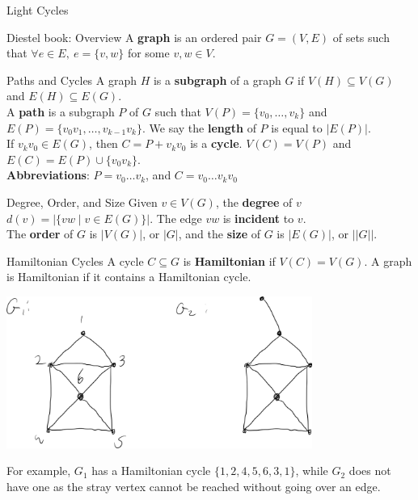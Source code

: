\documentclass[10pt]{extarticle}
\begin{document}
  \begin{problem}{Light Cycles}
    \begin{tcbraster}[raster columns = 1,colframe = black!75!white,colback=white]
    \end{tcbraster}
  \end{problem}
  \begin{problem}{Diestel book: Overview}
    A \textbf{graph} is an ordered pair $G = (V,E)$ of sets such that $\forall e\in E,~e=\{v,w\}$ for some $v,w\in V$.
    \begin{problem}{Paths and Cycles}
      A graph $H$ is a \textbf{subgraph} of a graph $G$ if $V(H) \subseteq V(G)$ and $E(H) \subseteq E(G)$. \\

      A \textbf{path} is a subgraph $P$ of $G$ such that $V(P) = \{v_0,\dots,v_k\}$ and $E(P) = \{v_0v_1,\dots,v_{k-1}v_k\}$. We say the \textbf{length} of $P$ is equal to $|E(P)|$.\\

      If $v_kv_0\in E(G)$, then $C = P + v_kv_0$ is a \textbf{cycle}. $V(C) = V(P)$ and $E(C) = E(P) \cup \{v_0v_k\}$.\\

      \textbf{Abbreviations}: $P = v_0\dots v_k$, and $C = v_0\dots v_kv_0$
    \end{problem}
    \begin{problem}{Degree, Order, and Size}
      Given $v\in V(G)$, the \textbf{degree} of $v$ $d(v) = |\{vw \mid v\in E(G)\}|$. The edge $vw$ is \textbf{incident} to $v$.\\

      The \textbf{order} of $G$ is $|V(G)|$, or $|G|$, and the \textbf{size} of $G$ is $|E(G)|$, or $||G||$.
    \end{problem}
    \begin{problem}{Hamiltonian Cycles}
      A cycle $C\subseteq G$ is \textbf{Hamiltonian} if $V(C) = V(G)$. A graph is Hamiltonian if it contains a Hamiltonian cycle.
      \begin{center}
        \includegraphics[width=0.75\textwidth]{hamiltonian}
      \end{center}
      For example, $G_1$ has a Hamiltonian cycle $\{1,2,4,5,6,3,1\}$, while $G_2$ does not have one as the stray vertex cannot be reached without going over an edge.\\


\end{problem}
\end{problem}
\end{document}
